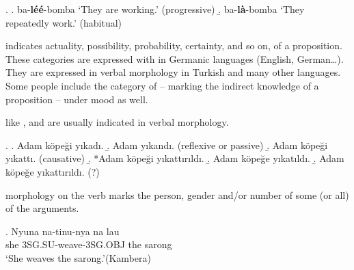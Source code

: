 \documentclass[11pt]{article}
\begin{document}
{{	\ex. 
	\a. ba-{\bf léé}-bomba  `They are working.’ (progressive)
    \b. ba-{\bf là}-bomba `They repeatedly work.’ (habitual)

	\item {} indicates actuality, possibility, probability, certainty,
	and so on, of a proposition.  These categories are expressed with  in
	Germanic languages (English, German\ldots). They are expressed in verbal
	morphology in Turkish and many other languages. Some people include the category of
	 -- marking the indirect knowledge of a proposition -- under mood as well. 


	\item {} like ,
	 and  are usually indicated in verbal morphology.

	\ex. 
	\a. Adam k\"ope\u gi  y\i{}kad\i{}.
	\b. Adam y\i{}kand\i{}. \hfill (reflexive or passive)		
 	\b. Adam  k\"ope\u gi y\i{}katt\i{}. \hfill (causative)
	\b. *Adam k\"ope\u gi y\i{katt}\i{r}\i{ld}\i.
	\b. Adam  k\"ope\u ge y\i{kat}\i{ld}\i.
	\b. Adam k\"ope\u ge y\i{katt}\i{r}\i{ld}\i. \hfill (?)


	\item {} morphology on the verb marks the person, gender
	and/or  number of some (or all) of the arguments. 
	
		\exg. Nyuna na-tinu-nya na lau\\
		she 3SG.SU-weave-3SG.OBJ the sarong\\
		`She weaves the sarong.'\hfill (Kambera)


	}
}
\end{document}
